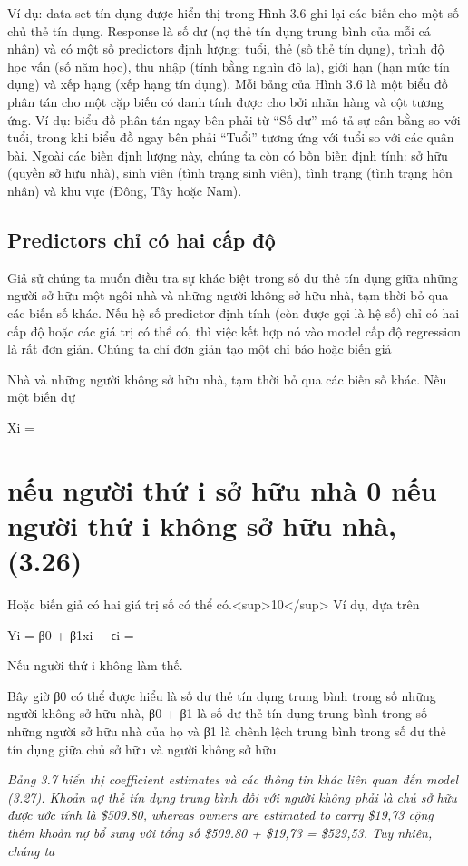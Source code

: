 Ví dụ: data set tín dụng được hiển thị trong Hình 3.6 ghi lại các biến cho một số chủ thẻ tín dụng. Response là số dư (nợ thẻ tín dụng trung bình của mỗi cá nhân) và có một số predictors định lượng: tuổi, thẻ (số thẻ tín dụng), trình độ học vấn (số năm học), thu nhập (tính bằng nghìn đô la), giới hạn (hạn mức tín dụng) và xếp hạng (xếp hạng tín dụng). Mỗi bảng của Hình 3.6 là một biểu đồ phân tán cho một cặp biến có danh tính được cho bởi nhãn hàng và cột tương ứng. Ví dụ: biểu đồ phân tán ngay bên phải từ “Số dư” mô tả sự cân bằng so với tuổi, trong khi biểu đồ ngay bên phải “Tuổi” tương ứng với tuổi so với các quân bài. Ngoài các biến định lượng này, chúng ta còn có bốn biến định tính: sở hữu (quyền sở hữu nhà), sinh viên (tình trạng sinh viên), tình trạng (tình trạng hôn nhân) và khu vực (Đông, Tây hoặc Nam).

\subsection{Predictors chỉ có hai cấp độ}

Giả sử chúng ta muốn điều tra sự khác biệt trong số dư thẻ tín dụng giữa những người sở hữu một ngôi nhà và những người không sở hữu nhà, tạm thời bỏ qua các biến số khác. Nếu hệ số predictor định tính (còn được gọi là hệ số) chỉ có hai cấp độ hoặc các giá trị có thể có, thì việc kết hợp nó vào model cấp độ regression là rất đơn giản. Chúng ta chỉ đơn giản tạo một chỉ báo hoặc biến giả

Nhà và những người không sở hữu nhà, tạm thời bỏ qua các biến số khác. Nếu một biến dự

Xi =

\section{nếu người thứ i sở hữu nhà 0 nếu người thứ i không sở hữu nhà, (3.26)}

Hoặc biến giả có hai giá trị số có thể có.<sup>10</sup> Ví dụ, dựa trên

Yi = β0 + β1xi + ϵi =

Nếu người thứ i không làm thế.

Bây giờ β0 có thể được hiểu là số dư thẻ tín dụng trung bình trong số những người không sở hữu nhà, β0 + β1 là số dư thẻ tín dụng trung bình trong số những người sở hữu nhà của họ và β1 là chênh lệch trung bình trong số dư thẻ tín dụng giữa chủ sở hữu và người không sở hữu.

\noindent\textit{Bảng 3.7 hiển thị coefficient estimates và các thông tin khác liên quan đến model (3.27). Khoản nợ thẻ tín dụng trung bình đối với người không phải là chủ sở hữu được ước tính là \$509.80, whereas owners are estimated to carry \$19,73 cộng thêm khoản nợ bổ sung với tổng số \$509.80 + \$19,73 = \$529,53. Tuy nhiên, chúng ta}

